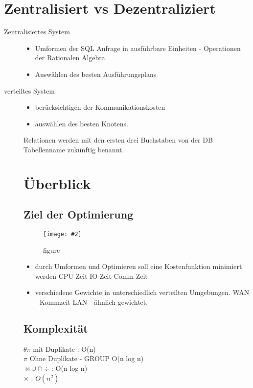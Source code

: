 \documentclass[a4paper,10pt,titlepage=false]{scrreprt}
\newcommand{\pic}[2][figure]{\begin{figure}[h]
 \centering
 \texttt{[image: \#2]}
 \caption{#1}
\end{figure}
}
\begin{document}
\section{Zentralisiert vs Dezentraliziert}
\begin{description}
 \item [Zentralisiertes System] 
 \begin{itemize}
  \item Umformen der SQL Anfrage in ausführbare Einheiten - Operationen der Rationalen Algebra.
  \item Auswählen des besten Ausführungsplans
 \end{itemize}
 \item[verteiltes System] \begin{itemize}
                           \item berücksichtigen der Kommunikationskosten
                           \item auswählen des besten Knotens.
                          \end{itemize}
Relationen werden mit den ersten drei Buchstaben von der DB Tabellenname zukünftig benannt.
\section{Überblick}
\subsection{Ziel der Optimierung}
\pic{zdo.png}

\begin{itemize}
 \item durch Umformen und Optimieren soll eine Kostenfunktion minimiert werden
 \subitem CPU Zeit
 \subitem IO Zeit
 \subitem Comm Zeit
 \item verschiedene Gewichte in unterschiedlich verteilten Umgebungen. WAN - Kommzeit LAN - ähnlich gewichtet.
 
\end{itemize}

\subsection{Komplexität}
$ \theta \pi $ mit Duplikate : O(n) \\
$ \pi$ Ohne Duplikate - GROUP O(n log n) \\
$ \bowtie \cup \cap \div$ : O(n log n) \\
$ \times $ : $O(n^2)$ 


\end{description}
\end{document}
